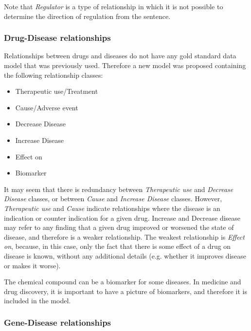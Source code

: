 \documentclass[final,12pt,3p,times,twocolumn,authoryear]{elsarticle}
\begin{document}
Note that \textit{Regulator} is a type of relationship in which it is not possible to determine the direction of regulation from the sentence.

\subsubsection{Drug-Disease relationships}

Relationships between drugs and diseases do not have any gold standard data model that was previously used. Therefore a new model was proposed containing the following relationship classes: 
\begin{itemize}
	\item Therapeutic use/Treatment
	\item Cause/Adverse event
	\item Decrease Disease
	\item Increase Disease
	\item Effect on
	\item Biomarker
\end{itemize}

It may seem that there is redundancy between \textit{Therapeutic use} and \textit{Decrease Disease} classes, or between \textit{Cause} and \textit{Increase Disease} classes. However, \textit{Therapeutic use} and \textit{Cause} indicate relationships where the disease is an indication or counter indication for a given drug. Increase and Decrease disease may refer to any finding that a given drug improved or worsened the state of disease, and therefore is a weaker relationship. The weakest relationship is \textit{Effect on}, because, in this case, only the fact that there is some effect of a drug on disease is known, without any additional details (e.g. whether it improves disease or makes it worse).  

The chemical compound can be a biomarker for some diseases. In medicine and drug discovery, it is important to have a picture of biomarkers, and therefore it is included in the model. 



\subsubsection{Gene-Disease relationships}
\end{document}
